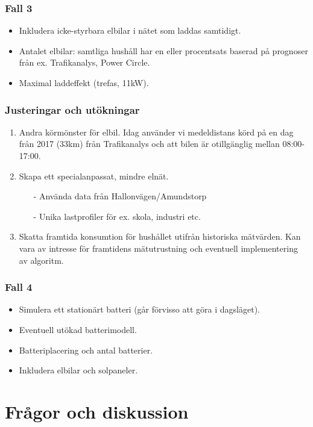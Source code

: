 \documentclass[noamsthm, swedish]{beamer}
\begin{document}
\begin{frame}
\frametitle{Fall 3}
    \begin{itemize}
        \item Inkludera icke-styrbara elbilar i nätet som laddas samtidigt.
        
        \item Antalet elbilar: samtliga hushåll har en eller procentsats baserad på prognoser från ex. Trafikanalys, Power Circle. 
        
        \item Maximal laddeffekt (trefas, 11kW). 
    \end{itemize}
\end{frame}

\begin{frame}
\frametitle{Justeringar och utökningar}
    \begin{enumerate}
         \item Andra körmönster för elbil. Idag använder vi medeldistans körd på en dag från 2017 (33km) från Trafikanalys och att bilen är otillgänglig mellan 08:00-17:00.
         
        \item Skapa ett specialanpassat, mindre elnät.
            \begin{itemize}
                \item[-] Använda data från Hallonvägen/Amundstorp
                \item[-] Unika lastprofiler för ex. skola, industri etc.
            \end{itemize}

        
      
        
        \item Skatta framtida konsumtion för hushållet utifrån historiska mätvärden. Kan vara av intresse för framtidens mätutrustning och eventuell implementering av algoritm. 
    \end{enumerate}
\end{frame}

\begin{frame}
\frametitle{Fall 4}
    \begin{itemize}
        \item Simulera ett stationärt batteri (går förvisso att göra i dagsläget). 
        
        \item Eventuell utökad batterimodell.
        
        \item Batteriplacering och antal batterier.
        
        \item Inkludera elbilar och solpaneler.
    \end{itemize}
\end{frame}

\section{Frågor och diskussion}
\end{document}
